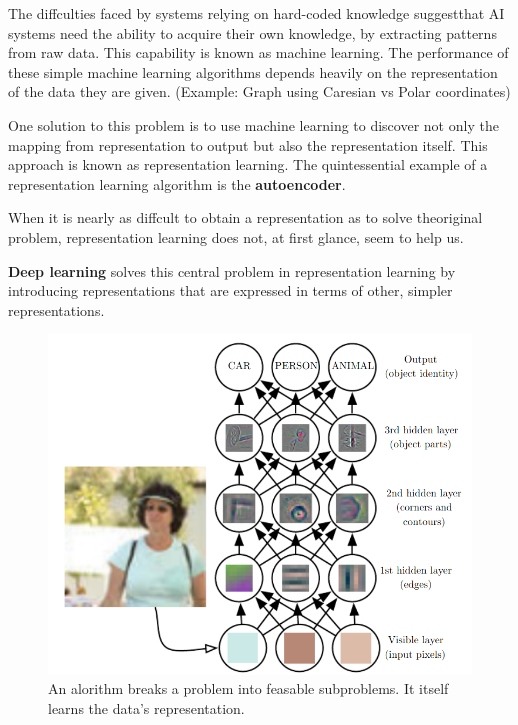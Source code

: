 \documentclass[../Main.tex]{subfiles}
\begin{document}
The diffculties faced by systems relying on hard-coded knowledge suggestthat AI systems 
need the ability to acquire their own knowledge, by extracting
patterns from raw data. This capability is known as machine learning.
The performance of these simple machine learning algorithms depends heavily
on the representation of the data they are given. (Example: Graph using Caresian vs Polar coordinates)


One solution to this problem is to use machine learning to discover not only
the mapping from representation to output but also the representation itself.
This approach is known as representation learning.
The quintessential example of a representation learning algorithm is the \textbf{autoencoder}.


When it is nearly as diffcult to obtain a representation as to solve theoriginal problem,
representation learning does not, at ﬁrst glance, seem to help us.

\textbf{Deep learning} solves this central problem in representation learning by 
introducing representations that are expressed in terms of other, simpler representations.


\begin{figure}[H]
    \centering
    \includegraphics[width=0.75\linewidth]{Images/multistepalgorithm.png}
    \caption{An alorithm breaks a problem into feasable subproblems. It itself learns the data's representation.}
\end{figure}
\end{document}
